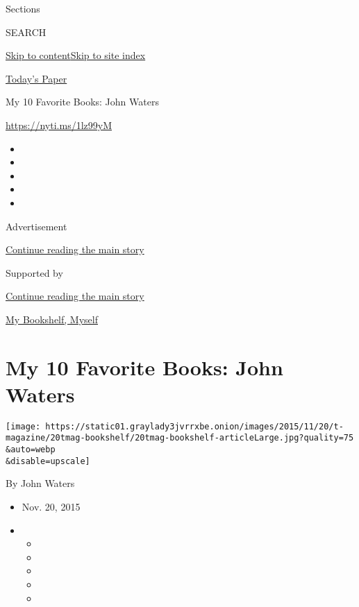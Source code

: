 Sections

SEARCH

\protect\hyperlink{site-content}{Skip to
content}\protect\hyperlink{site-index}{Skip to site index}

\href{https://myaccount.nytimes3xbfgragh.onion/auth/login?response_type=cookie\&client_id=vi}{}

\href{https://www.nytimes3xbfgragh.onion/section/todayspaper}{Today's
Paper}

My 10 Favorite Books: John Waters

\url{https://nyti.ms/1lz99yM}

\begin{itemize}
\item
\item
\item
\item
\item
\end{itemize}

Advertisement

\protect\hyperlink{after-top}{Continue reading the main story}

Supported by

\protect\hyperlink{after-sponsor}{Continue reading the main story}

\href{/column/my-bookshelf-myself}{My Bookshelf, Myself}

\hypertarget{my-10-favorite-books-john-waters}{%
\section{My 10 Favorite Books: John
Waters}\label{my-10-favorite-books-john-waters}}

\texttt{[image: https://static01.graylady3jvrrxbe.onion/images/2015/11/20/t-magazine/20tmag-bookshelf/20tmag-bookshelf-articleLarge.jpg?quality=75\\\&auto=webp\\\&disable=upscale]}

By John Waters

\begin{itemize}
\item
  Nov. 20, 2015
\item
  \begin{itemize}
  \item
  \item
  \item
  \item
  \item
  \end{itemize}
\end{itemize}

